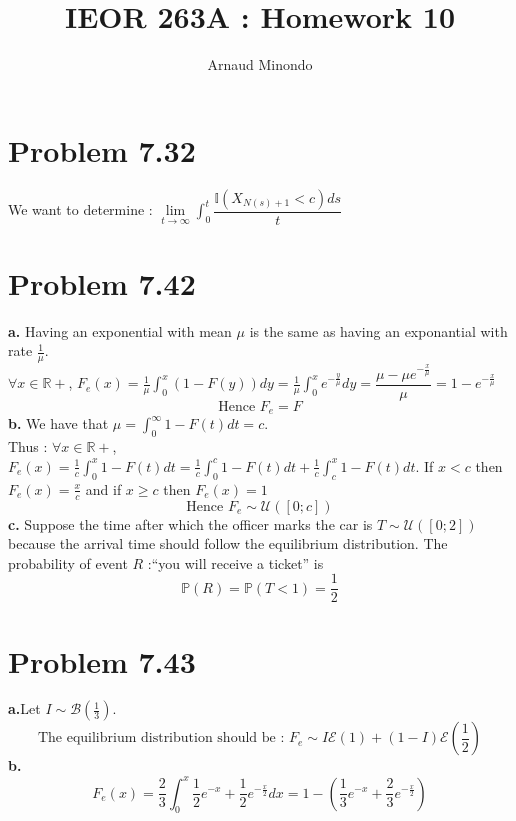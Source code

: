 \documentclass{article}
\title{IEOR 263A : Homework 10}
\author{Arnaud Minondo}
\begin{document}
\maketitle
\section*{Problem 7.32}
We want to determine : $\lim\limits_{t\to\infty}\displaystyle \int_0^t\dfrac{\mathbb{I}(X_{N(s)+1}<c) ds}{t}$
\section*{Problem 7.42}
\textbf{a.} Having an exponential with mean $\mu$ is the same as having an exponantial with rate $\frac{1}{\mu}$.
\\
$\forall x\in\mathbb{R}+$, $F_e(x) = \frac{1}{\mu}\int_0^x (1-F(y))dy = \frac{1}{\mu}\int_0^x e^{-\frac{y}{\mu}}dy = \dfrac{\mu - \mu e^{-\frac{x}{\mu}}}{\mu} = 1 - e^{-\frac{x}{\mu}}$
$$\boxed{\text{Hence } F_e = F }$$
\textbf{b.} We have that $\mu = \int_0^{\infty}1-F(t)dt = c$.
\\
Thus : $\forall x\in\mathbb{R}+$, $F_e(x) = \frac{1}{c}\int_0^{x}1-F(t)dt = \frac{1}{c}\int_0^{c}1-F(t)dt + \frac{1}{c}\int_c^x 1-F(t)dt$. If $x<c$ then $F_e(x) = \frac{x}{c}$ and if $x\ge c$ then $F_e(x) = 1$
$$\boxed{\text{Hence } F_e\sim \mathcal{U}([0;c])}$$
\textbf{c.} Suppose the time after which the officer marks the car is $T\sim\mathcal{U}([0;2])$ because the arrival time should follow the equilibrium distribution. The probability of event $R$ :``you will receive a ticket'' is $$\boxed{\mathbb{P}(R)= \mathbb{P}(T<1) = \frac{1}{2}}$$
\section*{Problem 7.43}
\textbf{a.}Let $I\sim \mathcal{B}(\frac{1}{3})$.$$\boxed{\text{The equilibrium distribution should be : }F_e\sim I\mathcal{E}(1)+(1-I)\mathcal{E}(\frac{1}{2})}$$
\textbf{b.} $$\boxed{F_e(x) = \frac{2}{3}\int_0^x \frac{1}{2}e^{-x}+\frac{1}{2}e^{-\frac{x}{2}}dx = 1 - (\frac{1}{3}e^{-x}+\frac{2}{3}e^{-\frac{x}{2}})}$$
\end{document}
